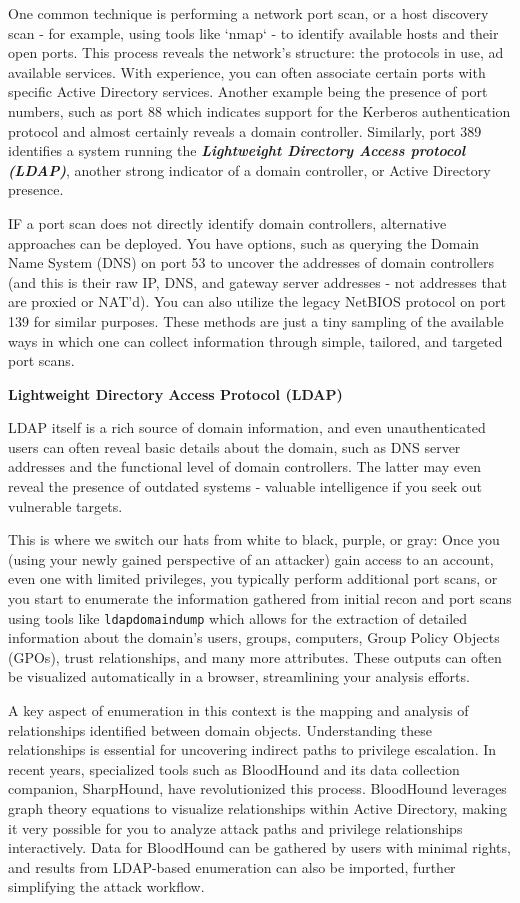 One common technique is performing a network port scan, or a host discovery scan - for example, using tools like `nmap` - to identify available hosts and their open ports. This process reveals the network’s structure: the protocols in use, ad available services. With experience, you can often associate certain ports with specific Active Directory services. Another example being the presence of port numbers, such as port 88 which indicates support for the Kerberos authentication protocol and almost certainly reveals a domain controller. Similarly, port 389 identifies a system running the \textit{\textbf{Lightweight Directory Access protocol (LDAP)}}, another strong indicator of a domain controller, or Active Directory presence.

IF a port scan does not directly identify domain controllers, alternative approaches can be deployed. You have options, such as querying the Domain Name System (DNS) on port 53 to uncover the addresses of domain controllers (and this is their raw IP, DNS, and gateway server addresses - not addresses that are proxied or NAT’d). You can also utilize the legacy NetBIOS protocol on port 139 for similar purposes. These methods are just a tiny sampling of the available ways in which one can collect information through simple, tailored, and targeted port scans.

\textbf{Lightweight Directory Access Protocol (LDAP)}

LDAP itself is a rich source of domain information, and even unauthenticated users can often reveal basic details about the domain, such as DNS server addresses and the functional level of domain controllers. The latter may even reveal the presence of outdated systems - valuable intelligence if you seek out vulnerable targets.

This is where we switch our hats from white to black, purple, or gray: Once you (using your newly gained perspective of an attacker) gain access to an account, even one with limited privileges, you typically perform additional port scans, or you start to enumerate the information gathered from initial recon and port scans using tools like \texttt{ldapdomaindump} which allows for the extraction of detailed information about the domain’s users, groups, computers, Group Policy Objects (GPOs), trust relationships, and many more attributes. These outputs can often be visualized automatically in a browser, streamlining your analysis efforts.

A key aspect of enumeration in this context is the mapping and analysis of relationships identified between domain objects. Understanding these relationships is essential for uncovering indirect paths to privilege escalation. In recent years, specialized tools such as BloodHound and its data collection companion, SharpHound, have revolutionized this process. BloodHound leverages graph theory equations to visualize relationships within Active Directory, making it very possible for you to analyze attack paths and privilege relationships interactively. Data for BloodHound can be gathered by users with minimal rights, and results from LDAP-based enumeration can also be imported, further simplifying the attack workflow.

